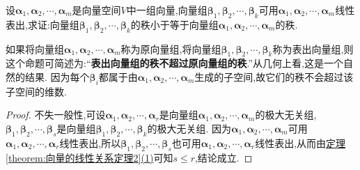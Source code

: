 \documentclass[../../main.tex]{subfiles}
\begin{document}
\begin{proposition}\label{proposition:表出向量组的秩不超过原向量组的秩}
设\(\boldsymbol{\alpha}_1,\boldsymbol{\alpha}_2,\cdots,\boldsymbol{\alpha}_m\)是向量空间\(V\)中一组向量,向量组\(\boldsymbol{\beta}_1,\boldsymbol{\beta}_2,\cdots,\boldsymbol{\beta}_k\)可用\(\boldsymbol{\alpha}_1,\boldsymbol{\alpha}_2,\cdots,\boldsymbol{\alpha}_m\)线性表出,求证:向量组\(\boldsymbol{\beta}_1,\boldsymbol{\beta}_2,\cdots,\boldsymbol{\beta}_k\)的秩小于等于向量组\(\boldsymbol{\alpha}_1,\boldsymbol{\alpha}_2,\cdots,\boldsymbol{\alpha}_m\)的秩.
\end{proposition}
\begin{remark}
如果将向量组\(\boldsymbol{\alpha}_1,\boldsymbol{\alpha}_2,\cdots,\boldsymbol{\alpha}_m\)称为原向量组,将向量组\(\boldsymbol{\beta}_1,\boldsymbol{\beta}_2,\cdots,\boldsymbol{\beta}_k\)称为表出向量组,则这个命题可简述为:“\textbf{表出向量组的秩不超过原向量组的秩}.”从几何上看,这是一个自然的结果. 因为每个\(\boldsymbol{\beta}_i\)都属于由\(\boldsymbol{\alpha}_1,\boldsymbol{\alpha}_2,\cdots,\boldsymbol{\alpha}_m\)生成的子空间,故它们的秩不会超过该子空间的维数.
\end{remark}
\begin{proof}
不失一般性,可设\(\boldsymbol{\alpha}_1,\boldsymbol{\alpha}_2,\cdots,\boldsymbol{\alpha}_r\)是向量组\(\boldsymbol{\alpha}_1,\boldsymbol{\alpha}_2,\cdots,\boldsymbol{\alpha}_m\)的极大无关组,\(\boldsymbol{\beta}_1,\boldsymbol{\beta}_2,\cdots,\boldsymbol{\beta}_s\)是向量组\(\boldsymbol{\beta}_1,\boldsymbol{\beta}_2,\cdots,\boldsymbol{\beta}_k\)的极大无关组. 因为\(\boldsymbol{\alpha}_1,\boldsymbol{\alpha}_2,\cdots,\boldsymbol{\alpha}_m\)可用\(\boldsymbol{\alpha}_1,\boldsymbol{\alpha}_2,\cdots,\boldsymbol{\alpha}_r\)线性表出,所以\(\boldsymbol{\beta}_1,\boldsymbol{\beta}_2,\cdots,\boldsymbol{\beta}_s\)也可用\(\boldsymbol{\alpha}_1,\boldsymbol{\alpha}_2,\cdots,\boldsymbol{\alpha}_r\)线性表出,从而由\hyperref[theorem:向量的线性关系定理2]{定理\ref{theorem:向量的线性关系定理2}(1)}可知\(s\leqslant  r\),结论成立.
\end{proof}
\end{document}
